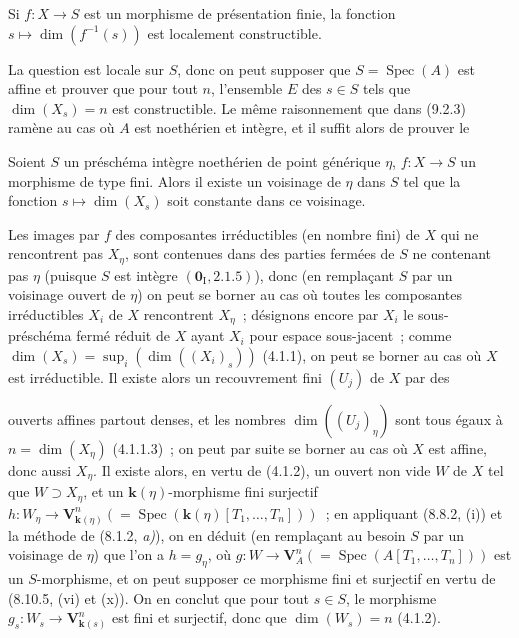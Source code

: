 \begin{proposition}[9.2.6.1]
\label{IV.9.2.6.1-fr}
Si $f:X\to S$ est un morphisme de présentation finie, la fonction
$s\mapsto\dim(f^{-1}(s))$ est localement constructible.
\end{proposition}

La question est locale sur $S$, donc on peut supposer que
$S=\operatorname{Spec}(A)$ est affine et prouver que pour tout $n$, l'ensemble
$E$ des $s\in S$ tels que $\dim(X_s)=n$ est constructible. Le même
raisonnement que dans (9.2.3) ramène au cas où $A$ est noethérien et intègre,
et il suffit alors de prouver le

\begin{corollary}[9.2.6.2]
\label{IV.9.2.6.2-fr}
Soient $S$ un préschéma intègre noethérien de point générique $\eta$,
$f:X\to S$ un morphisme de type fini. Alors il existe un voisinage de $\eta$
dans $S$ tel que la fonction $s\mapsto\dim(X_s)$ soit constante dans ce
voisinage.
\end{corollary}

Les images par $f$ des composantes irréductibles (en nombre fini) de $X$ qui
ne rencontrent pas $X_\eta$, sont contenues dans des parties fermées de $S$ ne
contenant pas $\eta$ (puisque $S$ est intègre
$(\mathbf 0_{\mathrm I},2.1.5)$), donc (en remplaçant $S$ par un voisinage
ouvert de $\eta$) on peut se borner au cas où toutes les composantes
irréductibles $X_i$ de $X$ rencontrent $X_\eta$~; désignons encore par $X_i$
le sous-préschéma fermé réduit de $X$ ayant $X_i$ pour espace sous-jacent~;
comme $\dim(X_s)=\sup_i(\dim((X_i)_s))$ (4.1.1), on peut se borner au cas où
$X$ est irréductible. Il existe alors un recouvrement fini $(U_j)$ de $X$ par
des

ouverts affines partout denses, et les nombres $\dim((U_j)_\eta)$ sont tous
égaux à $n=\dim(X_\eta)$ (4.1.1.3)~; on peut par suite se borner au cas où $X$
est affine, donc aussi $X_\eta$. Il existe alors, en vertu de (4.1.2), un
ouvert non vide $W$ de $X$ tel que $W\supset X_\eta$, et un
$\mathbf{k}(\eta)$-morphisme fini surjectif
$h:W_\eta\to\mathbf V_{\mathbf{k}(\eta)}^n
(=\operatorname{Spec}(\mathbf{k}(\eta)[T_1,\ldots,T_n]))$~; en appliquant
(8.8.2, (i)) et la méthode de (8.1.2, \emph{a)}), on en déduit (en remplaçant
au besoin $S$ par un voisinage de $\eta$) que l'on a $h=g_\eta$, où
$g:W\to\mathbf V_A^n(=\operatorname{Spec}(A[T_1,\ldots,T_n]))$ est un
$S$-morphisme, et on peut supposer ce morphisme fini et surjectif en vertu de
(8.10.5, (vi) et (x)). On en conclut que pour tout $s\in S$, le morphisme
$g_s:W_s\to\mathbf V_{\mathbf{k}(s)}^n$ est fini et surjectif, donc que
$\dim(W_s)=n$ (4.1.2).

